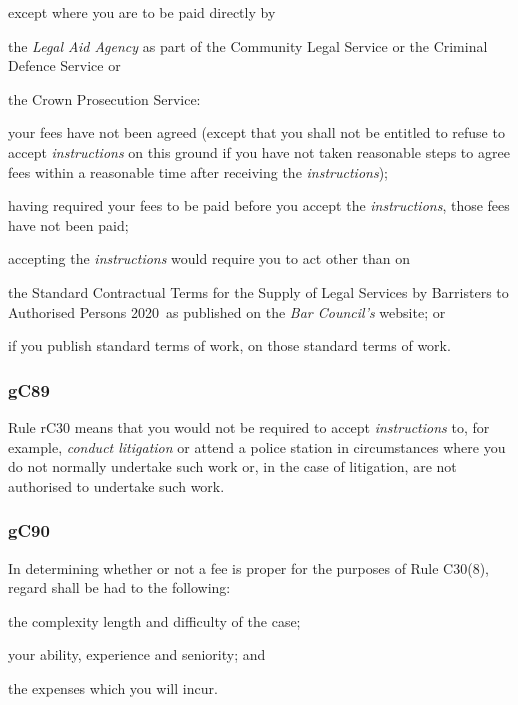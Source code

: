 \begin{numlist}
\item except where you are to be paid directly by 
\begin{romlist}
\item the \emph{Legal Aid
Agency} as part of the Community Legal Service or the Criminal Defence
Service or 
\item the Crown Prosecution Service:\end{romlist}
\begin{alphlist}
\item your fees have not been agreed (except that you shall not be entitled
to refuse to accept \emph{instructions} on this ground if you have not
taken reasonable steps to agree fees within a reasonable time after
receiving the \emph{instructions});

\item having required your fees to be paid before you accept the
\emph{instructions}, those fees have not been paid;

\item accepting the \emph{instructions} would require you to act other than
on 
\begin{Alphlist}
\item the Standard Contractual Terms for the Supply of Legal Services
by Barristers to Authorised Persons 2020~as published on the \emph{Bar
Council's} website; or \item if you publish standard terms of work, on
those standard terms of work.
\end{Alphlist}\end{alphlist}
\end{numlist}


\subsubsection{\color{darkgrey}gC89}

Rule rC30 means that you would not be required to accept
\emph{instructions} to, for example, \emph{conduct litigation} or attend
a police station in circumstances where you do not normally undertake
such work or, in the case of litigation, are not authorised to undertake
such work.

\subsubsection{\color{darkgrey}gC90}

In determining whether or not a fee is proper for the purposes of Rule
C30(8), regard shall be had to the following:
\begin{numlist}\item the complexity length and difficulty of the case;
\item your ability, experience and seniority; and
\item the expenses which you will incur.
\end{numlist}
